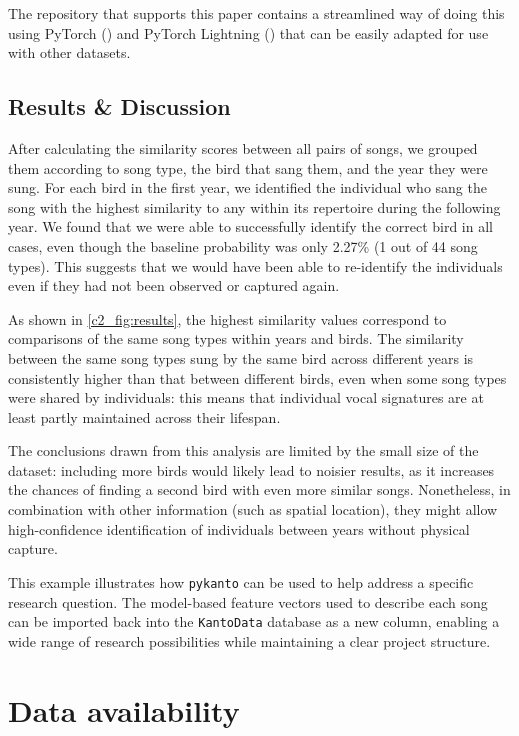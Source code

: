 The repository that supports this paper contains a streamlined way of doing this using PyTorch (\citeyear{pytorch2019}) and PyTorch Lightning (\citeyear{pytorchlightning2019}) that can be easily adapted for use with other datasets.


\subsection{Results \& Discussion}

After calculating the similarity scores between all pairs of songs, we grouped them according to song type, the bird that sang them, and the year they were sung. For each bird in the first year, we identified the individual who sang the song with the highest similarity to any within its repertoire during the following year. We found that we were able to successfully identify the correct bird in all cases, even though the baseline probability was only 2.27\% (1 out of 44 song types). This suggests that we would have been able to re-identify the individuals even if they had not been observed or captured again.

As shown in \autoref{c2_fig:results}, the highest similarity values correspond to
comparisons of the same song types within years and birds. The similarity
between the same song types sung by the same bird across different years is
consistently higher than that between different birds, even when some song types were shared by individuals: this means that individual vocal signatures are
at least partly maintained across their lifespan.

The conclusions drawn from this analysis are limited by the small size of the
dataset: including more birds would likely lead to noisier results, as it increases the chances of finding a second bird with even more similar songs. Nonetheless, in
combination with other information (such as spatial location), they might allow
high-confidence identification of individuals between years without physical
capture.

This example illustrates how \texttt{pykanto} can be used to help address a
specific research question. The model-based feature vectors used to describe each song
can be imported back into the \texttt{KantoData} database as a new column, enabling a
wide range of research possibilities while maintaining a clear project
structure.

\section{Data availability}

